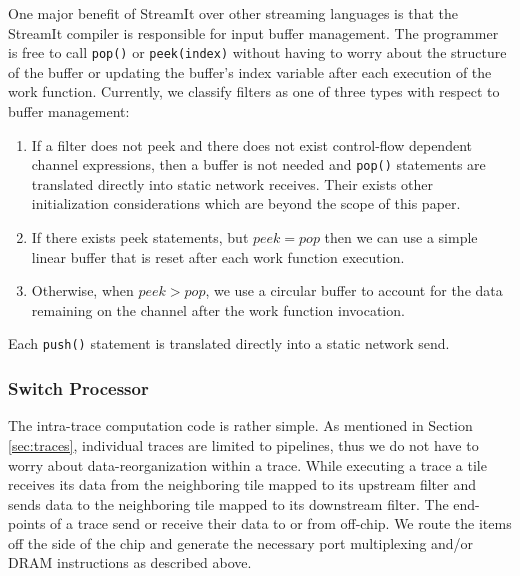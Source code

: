 One major benefit of StreamIt over other streaming languages is that
the StreamIt compiler is responsible for input buffer management.  The
programmer is free to call {\tt pop()} or {\tt peek(index)} without
having to worry about the structure of the buffer or updating the
buffer's index variable after each execution of the work function.
Currently, we classify filters as one of three types with respect to
buffer management: 
\begin{enumerate}
\item If a filter does not peek and there does not exist
control-flow dependent channel expressions, then a buffer is not needed
and {\tt pop()} statements are translated directly into static network
receives.  Their exists other initialization considerations which are
beyond the scope of this paper.
\item If there exists peek statements, but $peek = pop$ then we can
use a simple linear buffer that is reset after each work function execution.
\item Otherwise, when $peek > pop$, we use a circular buffer to account for the data
remaining on the channel after the work function invocation.
\end{enumerate}
Each {\tt push()} statement is translated directly into a static
network send.  

\subsubsection{Switch Processor}
The intra-trace computation code is rather simple.  As mentioned in
Section \ref{sec:traces}, individual traces are limited to pipelines,
thus we do not have to worry about data-reorganization within a trace.
While executing a trace a tile receives its data from the
neighboring tile mapped to its upstream filter and sends data to the
neighboring tile mapped to its downstream filter.  The end-points of a
trace send or receive their data to or from off-chip.  We route the
items off the side of the chip and generate the necessary port
multiplexing and/or DRAM instructions as described above.

